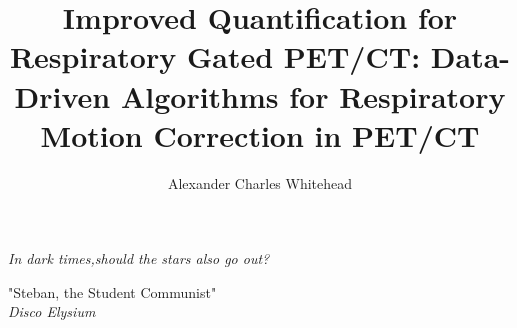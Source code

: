 
\title{Improved Quantification for Respiratory Gated PET/CT: Data-Driven Algorithms for Respiratory Motion Correction in PET/CT}
\author{Alexander Charles Whitehead}

\maketitle




\thispagestyle{empty}
\vspace*{\fill}
\setlength{\epigraphwidth}{0.7\linewidth}
\renewcommand{\epigraphflush}{center}
\renewcommand{\epigraphsize}{\large}
\epigraph{\textit{In dark times,\newline should the stars also go out?}}%
         {"Steban, the Student Communist"\\ \textit{Disco Elysium}}
\vfill

\begin{abstract}
    
\end{abstract}

\begin{impactstatement}
    \begin{quote}
        
    \end{quote}
\end{impactstatement}


